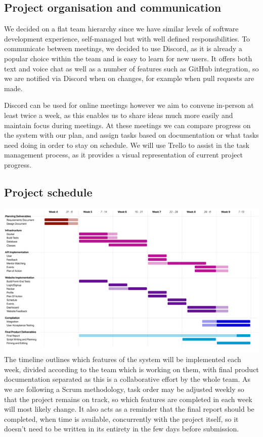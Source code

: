 \documentclass[10pt]{article}
\begin{document}
\subsection{Project organisation and communication}
We decided on a flat team hierarchy since we have similar levels of software
development experience, self-managed but with well defined responsibilities. To
communicate between meetings, we decided to use Discord, as it is already a
popular choice within the team and is easy to learn for new users. It offers
both text and voice chat as well as a number of features such as GitHub
integration, so we are notified via Discord when on changes, for example when
pull requests are made.

Discord can be used for online meetings however we aim to convene in-person at
least twice a week, as this enables us to share ideas much more easily and
maintain focus during meetings. At these meetings we can compare progress on the
system with our plan, and assign tasks based on documentation or what tasks need
doing in order to stay on schedule. We will use Trello to assist in the task
management process, as it provides a visual representation of current project
progress.

\subsection{Project schedule}
\includegraphics{Timetable}
\\
The timeline outlines which features of the system will be implemented each
week, divided according to the team which is working on them, with final product
documentation separated as this is a collaborative effort by the whole team. As
we are following a Scrum methodology, task order may be adjusted weekly so that
the project remains on track, so which features are completed in each week will
most likely change. It also acts as a reminder that the final report should be
completed, when time is available, concurrently with the project itself, so it
doesn’t need to be written in its entirety in the few days before submission.
\end{document}

